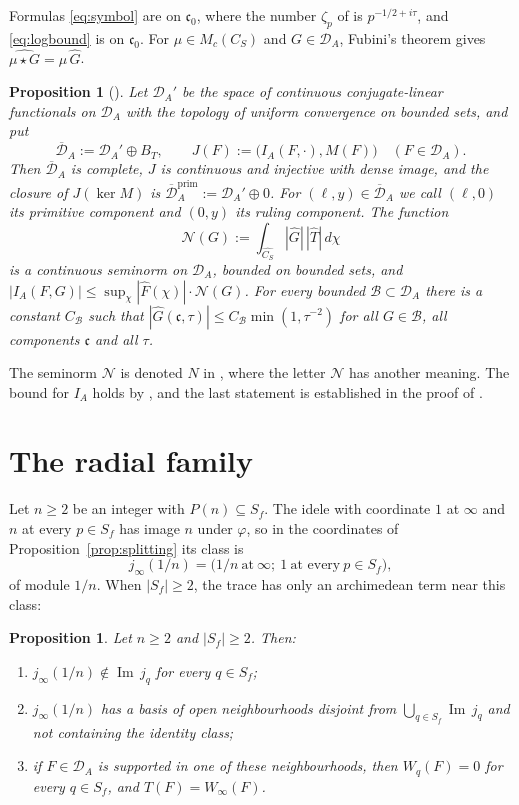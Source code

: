 \documentclass[11pt]{amsart}
\newtheorem{proposition}[theorem]{Proposition}
\theoremstyle{definition}
\newcommand{\Iml}{\operatorname{Im}}
\newcommand{\DA}{\mathcal D_A}
\newcommand{\Dbar}{\overline{\mathcal D}_A}
\begin{document}
\noindent Formulas \eqref{eq:symbol} are \cite[(45), (47)]{Companion} on
$\mathfrak c_0$, where the number $\zeta_p$ of \cite[(45)]{Companion} is
$p^{-1/2+i\tau}$, and \eqref{eq:logbound} is \cite[(69)]{Companion} on
$\mathfrak c_0$. For $\mu\in M_c(C_S)$ and $G\in\DA$, Fubini's theorem gives
$\widehat{\mu\star G}=\widehat\mu\,\widehat G$.

\begin{proposition}[{\cite[Lemma~6.2, Theorem~6.11, Theorem~6.13]{Companion}}]
\label{prop:completion}
Let $\DA'$ be the space of continuous conjugate-linear functionals on $\DA$
with the topology of uniform convergence on bounded sets, and put
\[
  \Dbar:=\DA'\oplus B_T,\qquad
  J(F):=\bigl(I_A(F,\cdot),M(F)\bigr)\quad(F\in\DA).
\]
Then $\Dbar$ is complete, $J$ is continuous and injective with dense image,
and the closure of $J(\ker M)$ is $\Dbar^{\mathrm{prim}}:=\DA'\oplus0$. For
$(\ell,y)\in\Dbar$ we call $(\ell,0)$ its primitive component and $(0,y)$ its
ruling component. The function
\[
  \mathcal N(G):=\int_{\widehat{C_S}}|\widehat G|\,|\widehat T|\,d\chi
\]
is a continuous seminorm on $\DA$, bounded on bounded sets, and
$|I_A(F,G)|\le\sup_\chi|\widehat F(\chi)|\cdot\mathcal N(G)$. For every bounded
$\mathcal B\subset\DA$ there is a constant $C_{\mathcal B}$ such that
$|\widehat G(\mathfrak c,\tau)|\le C_{\mathcal B}\min(1,\tau^{-2})$ for all
$G\in\mathcal B$, all components $\mathfrak c$ and all $\tau$.
\end{proposition}

\noindent The seminorm $\mathcal N$ is denoted $N$ in \cite{Companion}, where
the letter $\mathcal N$ has another meaning. The bound for $I_A$ holds by
\cite[(68), (71)]{Companion}, and the
last statement is established in the proof of \cite[Lemma~6.2]{Companion}.

\section{The radial family}\label{sec:radial}

Let $n\ge2$ be an integer with $P(n)\subseteq S_f$. The idele with coordinate
$1$ at $\infty$ and $n$ at every $p\in S_f$ has image $n$ under $\varphi$, so
in the coordinates of Proposition~\ref{prop:splitting} its class is
\[
  j_\infty(1/n)=\bigl(1/n\ \text{at}\ \infty;\ 1\ \text{at every}\ p\in S_f\bigr),
\]
of module $1/n$. When $|S_f|\ge2$, the trace has only an archimedean term
near this class:

\begin{proposition}\label{prop:noslice}
Let $n\ge2$ and $|S_f|\ge2$. Then:
\begin{enumerate}
\item[(i)] $j_\infty(1/n)\notin\Iml\,j_q$ for every $q\in S_f$;
\item[(ii)] $j_\infty(1/n)$ has a basis of open neighbourhoods disjoint from
$\bigcup_{q\in S_f}\Iml\,j_q$ and not containing the identity class;
\item[(iii)] if $F\in\DA$ is supported in one of these neighbourhoods, then
$W_q(F)=0$ for every $q\in S_f$, and $T(F)=W_\infty(F)$.
\end{enumerate}
\end{proposition}
\end{document}
